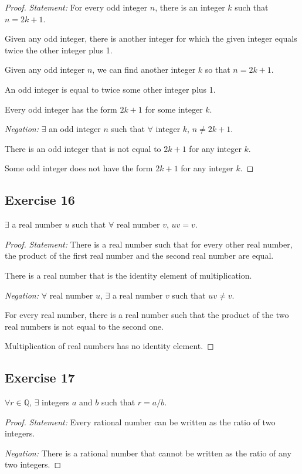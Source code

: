 \documentclass[14pt]{extarticle}
\newcommand{\Q}{\mathbb{Q}}
\newcommand{\fa}{\forall}
\newcommand{\te}{\exists}
\begin{document}
\begin{proof}
    {\it Statement:} For every odd integer $n$, there is an integer $k$ such that $n = 2k + 1$.

    Given any odd integer, there is another integer for which the given integer equals twice the other integer plus 1.

    Given any odd integer $n$, we can find another integer $k$ so that $n = 2k + 1$.

    An odd integer is equal to twice some other integer plus 1.

    Every odd integer has the form $2k + 1$ for some integer $k$.

        {\it Negation:} $\te$ an odd integer $n$ such that $\fa$ integer $k$, $n \neq 2k + 1$.

    There is an odd integer that is not equal to $2k + 1$ for
    any integer $k$.

    Some odd integer does not have the form $2k + 1$ for any integer $k$.
\end{proof}

\subsection{Exercise 16}
$\te$ a real number $u$ such that $\fa$ real number $v$, $uv = v$.

\begin{proof}
    {\it Statement:} There is a real number such that for every other real number, the product of the first real number and the second real number are equal.

    There is a real number that is the identity element of multiplication.

        {\it Negation:} $\fa$ real number $u$, $\te$ a real number $v$ such that $uv \neq v$.

    For every real number, there is a real number such that the product of the two real numbers is not equal to the second one.

    Multiplication of real numbers has no identity element.
\end{proof}

\subsection{Exercise 17}
$\fa r \in \Q$, $\te$ integers $a$ and $b$ such that $r = a/b$.

\begin{proof}
    {\it Statement:} Every rational number can be written as the ratio of two integers.

        {\it Negation:} There is a rational number that cannot be written as the ratio of any two integers.
\end{proof}
\end{document}
